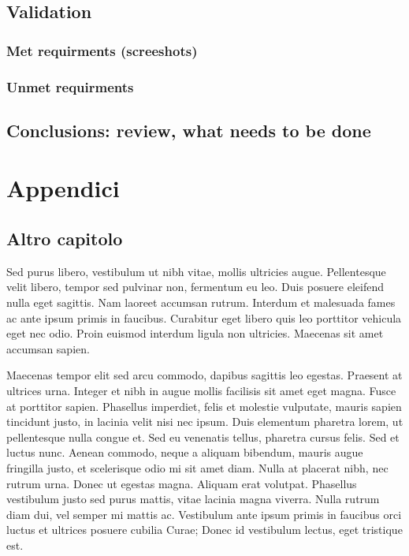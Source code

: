 \documentclass[target=bach]{thud}[2019/10/17]
\begin{document}
\chapter{Validation}
\section{Met requirments (screeshots)}
\section{Unmet requirments}

\chapter{Conclusions: review, what needs to be done}

\appendix

\part{Appendici}

\chapter{Altro capitolo}
Sed purus libero, vestibulum ut nibh vitae, mollis ultricies augue. Pellentesque velit libero, tempor sed pulvinar non, fermentum eu leo. Duis posuere eleifend nulla eget sagittis. Nam laoreet accumsan rutrum. Interdum et malesuada fames ac ante ipsum primis in faucibus. Curabitur eget libero quis leo porttitor vehicula eget nec odio. Proin euismod interdum ligula non ultricies. Maecenas sit amet accumsan sapien.

\backmatter

\summary
Maecenas tempor elit sed arcu commodo, dapibus sagittis leo egestas. Praesent at ultrices urna. Integer et nibh in augue mollis facilisis sit amet eget magna. Fusce at porttitor sapien. Phasellus imperdiet, felis et molestie vulputate, mauris sapien tincidunt justo, in lacinia velit nisi nec ipsum. Duis elementum pharetra lorem, ut pellentesque nulla congue et. Sed eu venenatis tellus, pharetra cursus felis. Sed et luctus nunc. Aenean commodo, neque a aliquam bibendum, mauris augue fringilla justo, et scelerisque odio mi sit amet diam. Nulla at placerat nibh, nec rutrum urna. Donec ut egestas magna. Aliquam erat volutpat. Phasellus vestibulum justo sed purus mattis, vitae lacinia magna viverra. Nulla rutrum diam dui, vel semper mi mattis ac. Vestibulum ante ipsum primis in faucibus orci luctus et ultrices posuere cubilia Curae; Donec id vestibulum lectus, eget tristique est.



\end{document}
